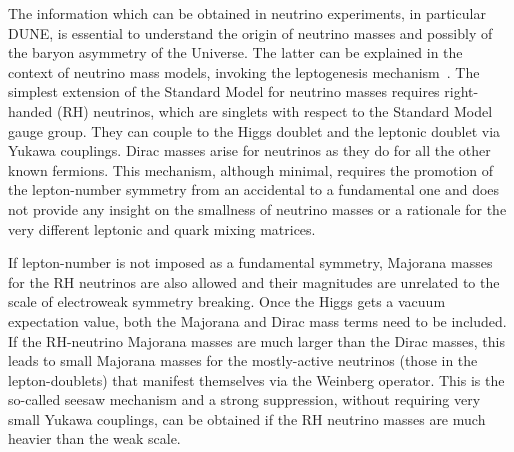 The information which can be obtained in neutrino experiments, in particular DUNE, is essential to understand the origin of neutrino masses and possibly of the baryon asymmetry of the Universe. The latter can be explained in the context of neutrino mass models, invoking the leptogenesis mechanism~\cite{Fukugita:1986hr}. The simplest extension of the Standard Model for neutrino masses requires right-handed (RH) neutrinos, which are singlets with respect to the Standard Model gauge group. They can couple to the Higgs doublet and the leptonic doublet via Yukawa couplings. Dirac masses arise for neutrinos as they do for all the other known fermions. This mechanism, although minimal, requires the promotion of the lepton-number symmetry from an accidental to a fundamental one and does not provide any insight on the smallness of neutrino masses or a rationale for the very different leptonic and quark mixing matrices.


If lepton-number is not imposed as a fundamental symmetry, Majorana masses for the RH neutrinos are also allowed and their magnitudes are unrelated to the scale of electroweak symmetry breaking. Once the Higgs gets a vacuum expectation value, both the Majorana and Dirac mass terms need to be included. If the RH-neutrino Majorana masses are much larger than the Dirac masses, this leads to small Majorana masses for the mostly-active neutrinos (those in the lepton-doublets) that manifest themselves via the Weinberg operator. This is the so-called seesaw mechanism and a strong suppression, without requiring very small Yukawa couplings, can be obtained if the RH neutrino masses are much heavier than the weak scale. 

